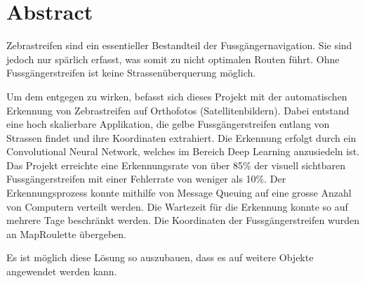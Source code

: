 \section{Abstract}

Zebrastreifen sind ein essentieller Bestandteil der Fussgängernavigation. Sie sind jedoch  nur spärlich erfasst, was somit zu nicht optimalen Routen führt. Ohne Fussgängerstreifen ist keine Strassenüberquerung möglich.

Um dem entgegen zu wirken,  befasst sich dieses Projekt mit der automatischen Erkennung von Zebrastreifen auf Orthofotos (Satellitenbildern). 
Dabei entstand eine hoch skalierbare Applikation, die gelbe Fussgängerstreifen entlang von Strassen findet und ihre Koordinaten extrahiert. Die Erkennung erfolgt durch ein Convolutional Neural Network, welches im Bereich Deep Learning anzusiedeln ist.
Das Projekt erreichte eine Erkennungsrate von über 85\% der visuell sichtbaren Fussgängerstreifen mit einer Fehlerrate von weniger als 10\%. Der Erkennungsprozess konnte mithilfe von Message Queuing auf eine grosse Anzahl von Computern verteilt werden. Die Wartezeit für die Erkennung konnte so auf mehrere Tage beschränkt werden. Die Koordinaten der Fussgängerstreifen wurden an MapRoulette übergeben.

Es ist möglich diese Lösung so auszubauen, dass es auf weitere Objekte angewendet werden kann.
